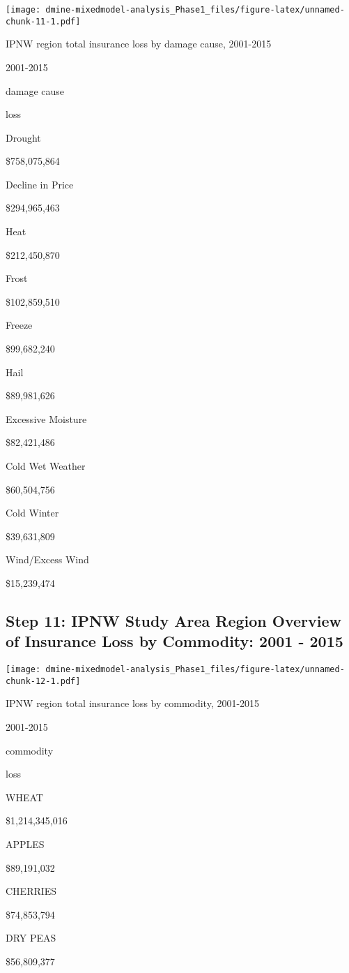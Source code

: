 \documentclass[]{article}
\begin{document}
\texttt{[image: dmine-mixedmodel-analysis\_Phase1\_files/figure-latex/unnamed-chunk-11-1.pdf]}

IPNW region total insurance loss by damage cause, 2001-2015

2001-2015

damage cause

loss

Drought

\$758,075,864

Decline in Price

\$294,965,463

Heat

\$212,450,870

Frost

\$102,859,510

Freeze

\$99,682,240

Hail

\$89,981,626

Excessive Moisture

\$82,421,486

Cold Wet Weather

\$60,504,756

Cold Winter

\$39,631,809

Wind/Excess Wind

\$15,239,474

\subsection{Step 11: IPNW Study Area Region Overview of Insurance Loss
by Commodity: 2001 -
2015}\label{step-11-ipnw-study-area-region-overview-of-insurance-loss-by-commodity-2001---2015}

\texttt{[image: dmine-mixedmodel-analysis\_Phase1\_files/figure-latex/unnamed-chunk-12-1.pdf]}

IPNW region total insurance loss by commodity, 2001-2015

2001-2015

commodity

loss

WHEAT

\$1,214,345,016

APPLES

\$89,191,032

CHERRIES

\$74,853,794

DRY PEAS

\$56,809,377
\end{document}
